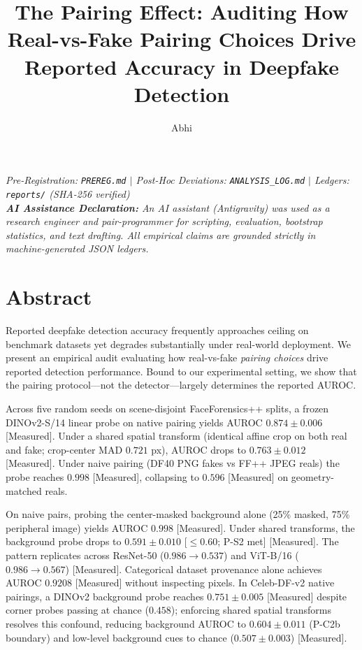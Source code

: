 \documentclass[10pt,twocolumn]{article}
\title{\textbf{The Pairing Effect: Auditing How Real-vs-Fake Pairing Choices Drive Reported Accuracy in Deepfake Detection}}
\author[1]{Abhi}
\affil[1]{Department of Artificial Intelligence \& Machine Learning, Madhav Institute of Technology and Science (MITS), Gwalior, India}
\date{}
\begin{document}
\maketitle

\noindent\small\textit{%
Pre-Registration: \texttt{PREREG.md} $\mid$
Post-Hoc Deviations: \texttt{ANALYSIS\_LOG.md} $\mid$
Ledgers: \texttt{reports/} (SHA-256 verified) \\
\textbf{AI Assistance Declaration:} An AI assistant (Antigravity) was used as a research engineer and pair-programmer for scripting, evaluation, bootstrap statistics, and text drafting.
All empirical claims are grounded strictly in machine-generated JSON ledgers.
}

\section*{Abstract}

Reported deepfake detection accuracy frequently approaches ceiling on benchmark datasets yet degrades substantially under real-world deployment.
We present an empirical audit evaluating how real-vs-fake \emph{pairing choices} drive reported detection performance.
Bound to our experimental setting, we show that the pairing protocol---not the detector---largely determines the reported AUROC.

Across five random seeds on scene-disjoint FaceForensics++ splits, a frozen DINOv2-S/14 linear probe on native pairing yields AUROC $0.874 \pm 0.006$ [Measured].
Under a shared spatial transform (identical affine crop on both real and fake; crop-center MAD $0.721$ px), AUROC drops to $0.763 \pm 0.012$ [Measured].
Under naive pairing (DF40 PNG fakes vs FF++ JPEG reals) the probe reaches $0.998$ [Measured], collapsing to $0.596$ [Measured] on geometry-matched reals.

On naive pairs, probing the center-masked background alone (25\% masked, 75\% peripheral image) yields AUROC $0.998$ [Measured].
Under shared transforms, the background probe drops to $0.591 \pm 0.010$ [$\leq 0.60$; P-S2 met] [Measured].
The pattern replicates across ResNet-50 ($0.986 \to 0.537$) and ViT-B/16 ($0.986 \to 0.567$) [Measured].
Categorical dataset provenance alone achieves AUROC $0.9208$ [Measured] without inspecting pixels.
In Celeb-DF-v2 native pairings, a DINOv2 background probe reaches $0.751 \pm 0.005$ [Measured] despite corner probes passing at chance ($0.458$); enforcing shared spatial transforms resolves this confound, reducing background AUROC to $0.604 \pm 0.011$ (P-C2b boundary) and low-level background cues to chance ($0.507 \pm 0.003$) [Measured].
\end{document}
